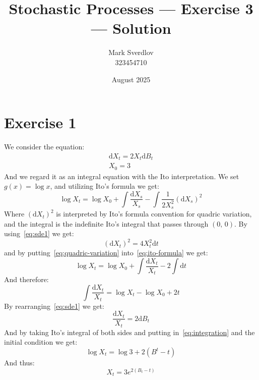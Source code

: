 \documentclass{article}
\title{Stochastic Processes --- Exercise 3 --- Solution}
\author{Mark Sverdlov \\ 323454710}
\date{August 2025}
\theoremstyle{plain}
\theoremstyle{definition}
\theoremstyle{definition}
\theoremstyle{remark}
\newcommand{\diff}{\mathrm{d}}
\begin{document}
\maketitle
    \section{Exercise 1}
        We consider the equation:
        \begin{gather}
            \label{eq:sde1}
            \diff X_{t} = 2X_{t}\diff B_{t} \\
            X_{0} = 3
        \end{gather}
        And we regard it as an integral equation with the Ito interpretation. We set \(g \left(x\right) = \log x\), and utilizing Ito's formula we get:
        \begin{equation}
            \label{eq:ito-formula}
            \log X_{t} = \log X_{0} + \int \frac{\diff X_{s}}{X_{s}} - \int \frac{1}{2X_{s}^{2}} \left(\diff X_{s}\right)^{2}
        \end{equation}
        Where \(\left(\diff X_{t}\right)^{2}\) is interpreted by Ito's formula convention for quadric variation, and the integral is the indefinite Ito's integral that passes through \(\left(0,\,0\right)\). By using~\eqref{eq:sde1} we get:
        \begin{equation}
            \label{eq:quadric-variation}
            \left(\diff X_{t}\right)^{2} = 4X_{t}^{2} \diff t
        \end{equation}
        and by putting~\eqref{eq:quadric-variation} into~\eqref{eq:ito-formula} we get:
        \begin{equation*}
           \log X_{t} = \log X_{0} + \int \frac{\diff X_{t}}{X_{t}} -2 \int \diff t
        \end{equation*}
        And therefore:
        \begin{equation}
            \label{eq:integration}
            \int \frac{\diff  X_{t}}{X_{t}} = \log X_{t} - \log X_{0} + 2t
        \end{equation}
        By rearranging~\eqref{eq:sde1} we get:
        \begin{equation*}
            \frac{\diff X_{t}}{X_{t}} = 2 \diff B_{t}
        \end{equation*}
        And by taking Ito's integral of both sides and putting in~\eqref{eq:integration} and the initial condition we get:
        \begin{equation*}
           \log X_{t} = \log 3 + 2 \left(B^{t}-t\right)
        \end{equation*}
        And thus:
        \begin{equation*}
            X_{t} = 3 e^{2\left(B_{t}-t\right)}
        \end{equation*}
\end{document}
